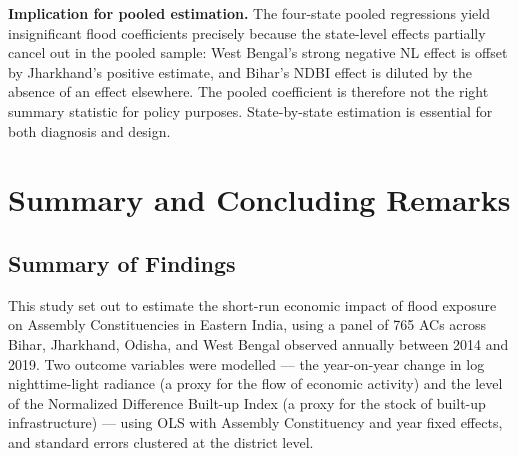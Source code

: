 \documentclass[12pt,a4paper,oneside]{report}
\begin{document}
\textbf{Implication for pooled estimation.} The four-state pooled regressions yield insignificant flood coefficients precisely because the state-level effects partially cancel out in the pooled sample: West Bengal's strong negative NL effect is offset by Jharkhand's positive estimate, and Bihar's NDBI effect is diluted by the absence of an effect elsewhere. The pooled coefficient is therefore not the right summary statistic for policy purposes. State-by-state estimation is essential for both diagnosis and design.

\chapter{Summary and Concluding Remarks}

\section{Summary of Findings}
This study set out to estimate the short-run economic impact of flood exposure on Assembly Constituencies in Eastern India, using a panel of 765 ACs across Bihar, Jharkhand, Odisha, and West Bengal observed annually between 2014 and 2019. Two outcome variables were modelled --- the year-on-year change in log nighttime-light radiance (a proxy for the flow of economic activity) and the level of the Normalized Difference Built-up Index (a proxy for the stock of built-up infrastructure) --- using OLS with Assembly Constituency and year fixed effects, and standard errors clustered at the district level.
\end{document}
